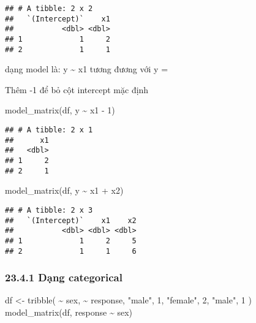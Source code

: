 \documentclass[
]{article}
\newenvironment{Shaded}{\begin{snugshade}}{\end{snugshade}}
\newcommand{\DecValTok}[1]{\textcolor[rgb]{0.00,0.00,0.81}{#1}}
\newcommand{\FunctionTok}[1]{\textcolor[rgb]{0.00,0.00,0.00}{#1}}
\newcommand{\NormalTok}[1]{#1}
\newcommand{\OtherTok}[1]{\textcolor[rgb]{0.56,0.35,0.01}{#1}}
\newcommand{\SpecialCharTok}[1]{\textcolor[rgb]{0.00,0.00,0.00}{#1}}
\newcommand{\StringTok}[1]{\textcolor[rgb]{0.31,0.60,0.02}{#1}}
\begin{document}
\begin{verbatim}
## # A tibble: 2 x 2
##   `(Intercept)`    x1
##           <dbl> <dbl>
## 1             1     2
## 2             1     1
\end{verbatim}

dạng model là: y \textasciitilde{} x1 tương đương với y =

Thêm -1 để bỏ cột intercept mặc định

\begin{Shaded}
\begin{Highlighting}[]
\FunctionTok{model\_matrix}\NormalTok{(df, y }\SpecialCharTok{\textasciitilde{}}\NormalTok{ x1 }\SpecialCharTok{{-}} \DecValTok{1}\NormalTok{)}
\end{Highlighting}
\end{Shaded}

\begin{verbatim}
## # A tibble: 2 x 1
##      x1
##   <dbl>
## 1     2
## 2     1
\end{verbatim}

\begin{Shaded}
\begin{Highlighting}[]
\FunctionTok{model\_matrix}\NormalTok{(df, y }\SpecialCharTok{\textasciitilde{}}\NormalTok{ x1 }\SpecialCharTok{+}\NormalTok{ x2)}
\end{Highlighting}
\end{Shaded}

\begin{verbatim}
## # A tibble: 2 x 3
##   `(Intercept)`    x1    x2
##           <dbl> <dbl> <dbl>
## 1             1     2     5
## 2             1     1     6
\end{verbatim}

\hypertarget{dux1ea1ng-categorical}{%
\subsubsection{23.4.1 Dạng categorical}\label{dux1ea1ng-categorical}}

\begin{Shaded}
\begin{Highlighting}[]
\NormalTok{df }\OtherTok{\textless{}{-}} \FunctionTok{tribble}\NormalTok{(}
  \SpecialCharTok{\textasciitilde{}}\NormalTok{ sex, }\SpecialCharTok{\textasciitilde{}}\NormalTok{ response,}
  \StringTok{"male"}\NormalTok{, }\DecValTok{1}\NormalTok{,}
  \StringTok{"female"}\NormalTok{, }\DecValTok{2}\NormalTok{,}
  \StringTok{"male"}\NormalTok{, }\DecValTok{1}
\NormalTok{)}
\FunctionTok{model\_matrix}\NormalTok{(df, response }\SpecialCharTok{\textasciitilde{}}\NormalTok{ sex)}
\end{Highlighting}
\end{Shaded}
\end{document}
